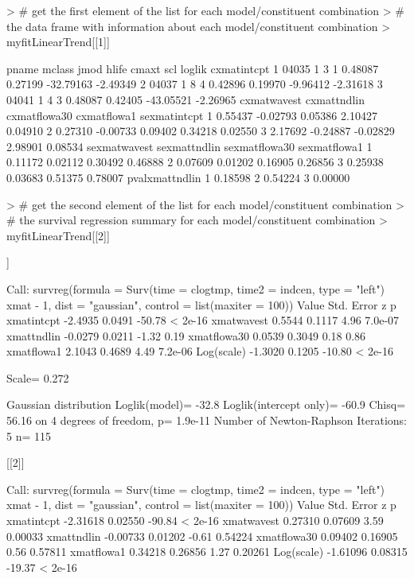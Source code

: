 \documentclass[11pt]{article}
\begin{document}
\begin{Schunk}
\begin{Sinput}
> # get the first element of the list for each model/constituent combination
> # the data frame with information about each model/constituent combination
> myfitLinearTrend[[1]]
\end{Sinput}
\begin{Soutput}
  pname mclass jmod hlife   cmaxt     scl    loglik cxmatintcpt
1 04035      1    3     1 0.48087 0.27199 -32.79163    -2.49349
2 04037      1    8     4 0.42896 0.19970  -9.96412    -2.31618
3 04041      1    4     3 0.48087 0.42405 -43.05521    -2.26965
  cxmatwavest cxmattndlin cxmatflowa30 cxmatflowa1 sexmatintcpt
1     0.55437    -0.02793      0.05386     2.10427      0.04910
2     0.27310    -0.00733      0.09402     0.34218      0.02550
3     2.17692    -0.24887     -0.02829     2.98901      0.08534
  sexmatwavest sexmattndlin sexmatflowa30 sexmatflowa1
1      0.11172      0.02112       0.30492      0.46888
2      0.07609      0.01202       0.16905      0.26856
3      0.25938      0.03683       0.51375      0.78007
  pvalxmattndlin
1        0.18598
2        0.54224
3        0.00000
\end{Soutput}
\begin{Sinput}
> # get the second element of the list for each model/constituent combination
> # the survival regression summary for each model/constituent combination
> myfitLinearTrend[[2]]
\end{Sinput}
\begin{Soutput}
[[1]]

Call:
survreg(formula = Surv(time = clogtmp, time2 = indcen, type = "left") ~ 
    xmat - 1, dist = "gaussian", control = list(maxiter = 100))
              Value Std. Error      z       p
xmatintcpt  -2.4935     0.0491 -50.78 < 2e-16
xmatwavest   0.5544     0.1117   4.96 7.0e-07
xmattndlin  -0.0279     0.0211  -1.32    0.19
xmatflowa30  0.0539     0.3049   0.18    0.86
xmatflowa1   2.1043     0.4689   4.49 7.2e-06
Log(scale)  -1.3020     0.1205 -10.80 < 2e-16

Scale= 0.272 

Gaussian distribution
Loglik(model)= -32.8   Loglik(intercept only)= -60.9
	Chisq= 56.16 on 4 degrees of freedom, p= 1.9e-11 
Number of Newton-Raphson Iterations: 5 
n= 115 


[[2]]

Call:
survreg(formula = Surv(time = clogtmp, time2 = indcen, type = "left") ~ 
    xmat - 1, dist = "gaussian", control = list(maxiter = 100))
               Value Std. Error      z       p
xmatintcpt  -2.31618    0.02550 -90.84 < 2e-16
xmatwavest   0.27310    0.07609   3.59 0.00033
xmattndlin  -0.00733    0.01202  -0.61 0.54224
xmatflowa30  0.09402    0.16905   0.56 0.57811
xmatflowa1   0.34218    0.26856   1.27 0.20261
Log(scale)  -1.61096    0.08315 -19.37 < 2e-16


\end{Soutput}
\end{Schunk}
\end{document}
